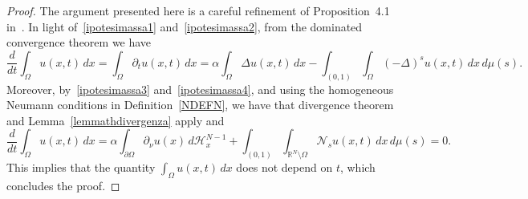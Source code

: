 \documentclass[12pt,a4paper,intlimits,sumlimits]{amsart}
\def \R {\mathbb{R}}
\def \Ns {\mathscr{N}_{s}}
\theoremstyle{definition}
\theoremstyle{plain}
\numberwithin{equation}{section}
\begin{document}
\begin{proof} The argument presented here is a careful refinement of Proposition~4.1 in~\cite{MR3651008}.
In light of~\eqref{ipotesimassa1} and~\eqref{ipotesimassa2},
from the dominated convergence theorem we have
\[
\frac{d}{dt}\int_\Omega u(x,t)\,dx
=\int_\Omega \partial_t u(x,t)\,dx
=\alpha \int_\Omega \Delta u(x,t)\,dx
-\int_{(0,1)}\int_\Omega(-\Delta)^s u(x,t)\,dx\,d\mu(s).
\]
Moreover, by~\eqref{ipotesimassa3} and~\eqref{ipotesimassa4}, and using the homogeneous Neumann conditions in Definition~\ref{NDEFN},
we have that divergence theorem and Lemma~\ref{lemmathdivergenza} apply and
\[
\frac{d}{dt}\int_\Omega u(x,t)\,dx
=\alpha\int_{\partial \Omega} \partial_\nu u(x)\,d\mathscr{H}_x^{N-1}
+\int_{(0,1)}\int_{\R^N\setminus \Omega} \Ns u(x,t)\,dx\,d\mu(s)
=0.
\]
This implies that the quantity $\int_\Omega u(x,t)\,dx$ does 
not depend on $t$, which concludes the proof.
\end{proof}
\end{document}
